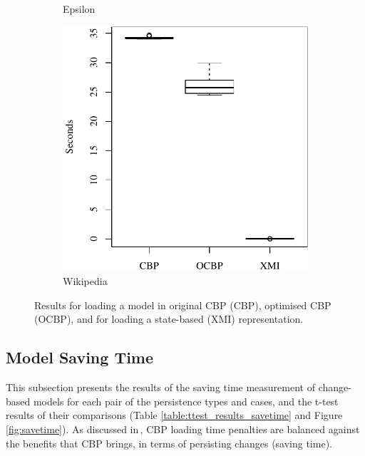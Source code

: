 \documentclass{llncs}
\begin{document}
{\begin{figure}[ht]
\begin{subfigure}{0.325\textwidth}
        \caption{Epsilon}
        \label{fig:load_time_epsilon}
    \end{subfigure}
    \hfill
    \begin{subfigure}{0.325\textwidth}
        \centering
        \includegraphics[width=\linewidth]{images/load_time_wikipedia}
        \caption{Wikipedia}
        \label{fig:load_time_wikipedia}
    \end{subfigure}
    \caption{Results for loading a model in original CBP (CBP), optimised CBP (OCBP), and for loading a state-based (XMI) representation.}
    \label{fig:loadtime}
\end{figure}

 \vspace{-25pt}
\subsection{Model Saving Time}
\label{subsec:saving_time_test}
 
  \vspace{-10pt}
 This subsection presents the results of the saving time measurement of change-based models for each pair of the persistence types and cases, and the t-test results of their comparisons (Table \ref{table:ttest_results_savetime} and Figure \ref{fig:savetime}). As discussed in\,\cite{yohannis2017turning}, CBP loading time penalties are balanced against the benefits that CBP brings, in terms of  persisting changes (saving time).
 
}
\end{document}
